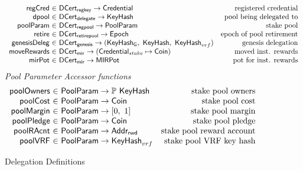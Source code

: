 \begin{figure}[htb]
\begin{equation*}
\begin{array}{r@{~\in~}lr}
      \fun{regCred} & \DCertRegKey \to \Credential & \text{registered credential} \\
      \fun{dpool} & \DCertDeleg \to \KeyHash
                                            & \text{pool being delegated to}
      \\
      \fun{poolParam} & \DCertRegPool \to \PoolParam
                                            & \text{stake pool}
      \\
      \fun{retire} & \DCertRetirePool \to \Epoch
                                            & \text{epoch of pool retirement}
      \\
      \fun{genesisDeleg} & \DCertGen \to (\KeyHashGen,~\KeyHash,~\KeyHash_{vrf})
                                            & \text{genesis delegation}
      \\
      \fun{moveRewards} & \DCertMir \to (\StakeCredential \mapsto \Coin)
                                            & \text{moved inst. rewards}
      \\
      \fun{mirPot} & \DCertMir \to \MIRPot & \text{pot for inst. rewards}
    \end{array}
  \end{equation*}
  \emph{Pool Parameter Accessor functions}
  \begin{equation*}
  \begin{array}{r@{~\in~}lr}
    \fun{poolOwners} & \PoolParam \to \powerset{\KeyHash}
                     & \text{stake pool owners}
    \\
    \fun{poolCost} & \PoolParam \to \Coin
                     & \text{stake pool cost}
    \\
    \fun{poolMargin} & \PoolParam \to \unitInterval
                     & \text{stake pool margin}
    \\
    \fun{poolPledge} & \PoolParam \to \Coin
                     & \text{stake pool pledge}
    \\
    \fun{poolRAcnt} & \PoolParam \to \AddrRWD
                     & \text{stake pool reward account}
    \\
    \fun{poolVRF} & \PoolParam \to \KeyHash_{vrf}
                  & \text{stake pool VRF key hash}
    \\
  \end{array}
  \end{equation*}

  \caption{Delegation Definitions}
  \label{fig:delegation-defs}
\end{figure}

\clearpage


